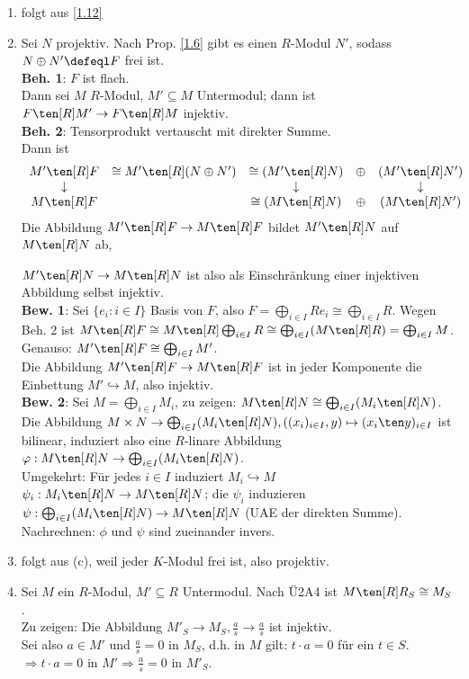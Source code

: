 \begin{Bew}
\begin{enumerate}
\item folgt aus \ref{1.12}
\item Sei $N$ projektiv. Nach Prop. \ref{1.6} gibt es einen $R$-Modul
$N'$, sodass $N \oplus N'\defeql F$ frei ist.\\ \textbf{Beh. 1}: $F$ ist flach.\\
Dann sei $M$ $R$-Modul, $M'\subseteq M$ Untermodul; dann ist $F\ten[R] M'\to F\ten[R] M$ injektiv.\\
\textbf{Beh. 2}: Tensorprodukt vertauscht mit direkter Summe.\\
Dann ist
\[
\begin{array}{ccccc}
M'\ten[R] F & \cong M'\ten[R](N\oplus N')   &\cong (M'\ten[R] N)&\oplus &(M'\ten[R] N') \\
\downarrow &                                 &\downarrow               &   &\downarrow\\
M\ten[R] F &                               &\cong (M\ten[R] N)&\oplus &(M\ten[R] N')\\
\end{array}
\]
Die Abbildung $M'\ten[R] F\to M\ten[R] F$ bildet $M'\ten[R] N$ auf $M\ten[R] N$ ab,

$M'\ten[R] N\to M\ten[R] N$ ist also als Einschr\"ankung einer injektiven Abbildung selbst injektiv.\\
\textbf{Bew. 1}: Sei $\{e_i:i\in I\}$ Basis  von $F$, also $F=\bigoplus_{i\in I} R e_i\cong \bigoplus_{i\in I} R$.
Wegen Beh. 2 ist $M\ten[R] F\cong M\ten[R] \bigoplus_{i\in I}R\cong \bigoplus_{i\in I}(M\ten[R] R)=\bigoplus_{i\in I}M$.
Genauso: $M' \ten[R] F\cong \bigoplus_{i\in I}M'$.\\
Die Abbildung $M'\ten[R] F\to M\ten[R] F$ ist in jeder Komponente die Einbettung $M'\hookrightarrow M$, also injektiv.\\
\textbf{Bew. 2}: Sei $M=\bigoplus_{i\in I} M_i$, zu zeigen: $M\ten[R] N \cong \bigoplus_{i\in I}(M_i\ten[R] N)$.\\
Die Abbildung $M\times N \to \bigoplus_{i\in I} (M_i\ten[R] N), \left((x_i)_{i \in I}, y\right)\mapsto (x_i\ten y)_{i\in I}$ ist bilinear, induziert
also eine $R$-linare Abbildung $\varphi: M\ten[R] N\to \bigoplus_{i\in I}(M_i\ten[R] N)$.\\
Umgekehrt: F\"ur jedes $i\in I$ induziert $M_i\hookrightarrow M$ $\psi_i : M_i\ten[R] N\to M\ten[R] N$;
die $\psi_i$ induzieren $\psi:\bigoplus_{i\in I}(M_i\ten[R] N)\to M\ten[R] N$ (UAE der direkten Summe).
\glqq Nachrechnen\grqq: $\phi$ und $\psi$ sind zueinander invers. 
\item folgt aus (c), weil jeder $K$-Modul frei ist, also projektiv.
\item Sei $M$ ein $R$-Modul, $M'\subseteq R$ Untermodul.
Nach \"U2A4 ist $M\ten[R] R_S \cong M_S$.\\
Zu zeigen: Die Abbildung $M'_S\to M_S, \frac{a}{s}\to \frac{a}{s}$ ist injektiv. \\
Sei also $a\in M'$ und $\frac{a}{s}=0$ in $M_S$, d.h. in $M$ gilt: $t\cdot a=0$ f\"ur ein $t\in S$.
$\Rightarrow t\cdot a = 0$ in $M'\Rightarrow \frac{a}{s}=0$ in $M'_S$.

\end{enumerate}
\end{Bew}
